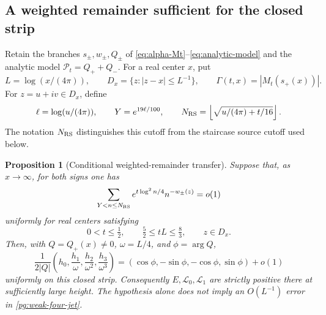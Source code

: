 \documentclass[11pt]{article}
\numberwithin{equation}{section}
\newtheorem{proposition}[theorem]{Proposition}
\theoremstyle{definition}
\theoremstyle{remark}
\newcommand{\Lag}{\mathcal L}
\begin{document}
\subsection{A weighted remainder sufficient for the closed strip}

Retain the branches $s_\pm,w_\pm,Q_\pm$ of
\eqref{eq:alpha-Mt}--\eqref{eq:analytic-model} and the analytic model
$\mathcal P_t=Q_++Q_-$.  For a real center $x$, put
\[
 L=\log(x/(4\pi)),\qquad D_x=\{z:|z-x|\le L^{-1}\},\qquad
 \Gamma(t,x)=|M_t(s_+(x))|.
\]
For $z=u+iv\in D_x$, define
\[
 \ell=\log(u/(4\pi)),\qquad Y=e^{19\ell/100},\qquad
 N_{\rm RS}=\left\lfloor\sqrt{u/(4\pi)+t/16}\right\rfloor.
\]
The notation $N_{\rm RS}$ distinguishes this cutoff from the
staircase source cutoff used below.

\begin{proposition}[Conditional weighted-remainder transfer]
\label{pg:weighted-transfer}
Suppose that, as $x\to\infty$, for both signs one has
\begin{equation}
 \sum_{Y<n\le N_{\rm RS}}e^{t\log^2n/4}n^{-w_\pm(z)}=o(1)
 \label{pg:weighted-target}
\end{equation}
uniformly for real centers satisfying
\[
 0<t\le\tfrac12,\qquad \tfrac52\le tL\le\tfrac83,
 \qquad z\in D_x.
\]
Then, with $Q=Q_+(x)\ne0$, $\omega=L/4$, and $\phi=\arg Q$,
\begin{equation}
 \frac{1}{2|Q|}\left(h_0,\frac{h_1}{\omega},
                 \frac{h_2}{\omega^2},\frac{h_3}{\omega^3}\right)
 = (\cos\phi,-\sin\phi,-\cos\phi,\sin\phi)+o(1)
 \label{pg:weak-four-jet}
\end{equation}
uniformly on this closed strip.  Consequently $E,\Lag_0,\Lag_1$
are strictly positive there at sufficiently large height.  The
hypothesis alone does not imply an $O(L^{-1})$ error in
\eqref{pg:weak-four-jet}.
\end{proposition}
\end{document}

